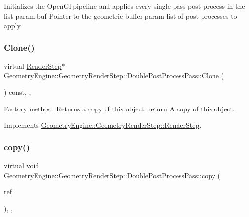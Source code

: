 Initializes the Open\+Gl pipeline and applies every single pass post process in the list param buf Pointer to the geometric buffer param list of post processes to apply \mbox{\label{class_geometry_engine_1_1_geometry_render_step_1_1_double_post_process_pass_a080175b6caf11b9b0e84b5c41c87d39a}} 
\subsubsection{\texorpdfstring{Clone()}{Clone()}}
{\footnotesize\ttfamily virtual \mbox{\hyperlink{class_geometry_engine_1_1_geometry_render_step_1_1_render_step}{Render\+Step}}$\ast$ Geometry\+Engine\+::\+Geometry\+Render\+Step\+::\+Double\+Post\+Process\+Pass\+::\+Clone (\begin{DoxyParamCaption}{ }\end{DoxyParamCaption}) const\hspace{0.3cm}{\ttfamily [inline]}, {\ttfamily [override]}, {\ttfamily [virtual]}}

Factory method. Returns a copy of this object. return A copy of this object. 

Implements \mbox{\hyperlink{class_geometry_engine_1_1_geometry_render_step_1_1_render_step_afe33ea9d82c5be11f55af7d39691d44b}{Geometry\+Engine\+::\+Geometry\+Render\+Step\+::\+Render\+Step}}.

\mbox{\label{class_geometry_engine_1_1_geometry_render_step_1_1_double_post_process_pass_a1fd491635a67d9d228142c41a66d222b}} 
\subsubsection{\texorpdfstring{copy()}{copy()}}
{\footnotesize\ttfamily virtual void Geometry\+Engine\+::\+Geometry\+Render\+Step\+::\+Double\+Post\+Process\+Pass\+::copy (\begin{DoxyParamCaption}\item[{const \mbox{\hyperlink{class_geometry_engine_1_1_geometry_render_step_1_1_double_post_process_pass}{Double\+Post\+Process\+Pass}} \&}]{ref }\end{DoxyParamCaption})\hspace{0.3cm}{\ttfamily [inline]}, {\ttfamily [protected]}, {\ttfamily [virtual]}}

